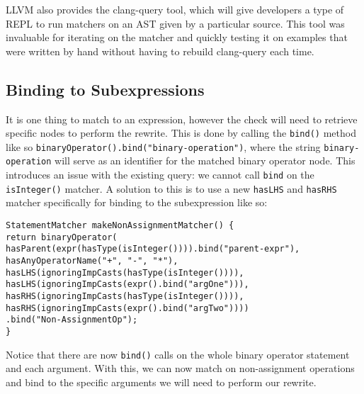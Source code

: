 LLVM also provides the clang-query tool, which will give developers a type of REPL to run matchers on an AST given by a particular source. This tool was invaluable for iterating on the matcher and quickly testing it on examples that were written by hand without having to rebuild clang-query each time.

\subsection{Binding to Subexpressions}

It is one thing to match to an expression, however the check will need to retrieve specific nodes to perform the rewrite. This is done by calling the \texttt{bind()} method like so \texttt{binaryOperator().bind("binary-operation")}, where the string \texttt{binary-operation} will serve as an identifier for the matched binary operator node. This introduces an issue with the existing query: we cannot call \texttt{bind} on the \texttt{isInteger()} matcher. A solution to this is to use a new \texttt{hasLHS} and \texttt{hasRHS} matcher specifically for binding to the subexpression like so:
\begin{center}
\parbox{0.9\linewidth}{
\texttt{StatementMatcher makeNonAssignmentMatcher() \{\\
\hspace*{2em}return binaryOperator(\\
\hspace*{2em}hasParent(expr(hasType(isInteger()))).bind("parent-expr"),\\
\hspace*{4em}hasAnyOperatorName("+", "-", "*"),\\
\hspace*{4em}hasLHS(ignoringImpCasts(hasType(isInteger()))),\\
\hspace*{4em}hasLHS(ignoringImpCasts(expr().bind("argOne"))),\\
\hspace*{4em}hasRHS(ignoringImpCasts(hasType(isInteger()))),\\
\hspace*{4em}hasRHS(ignoringImpCasts(expr().bind("argTwo"))))\\
\hspace*{2em}.bind("Non-AssignmentOp");\\
\}
}
}
\end{center}

Notice that there are now \texttt{bind()} calls on the whole binary operator statement and each argument. With this, we can now match on non-assignment operations and bind to the specific arguments we will need to perform our rewrite.


